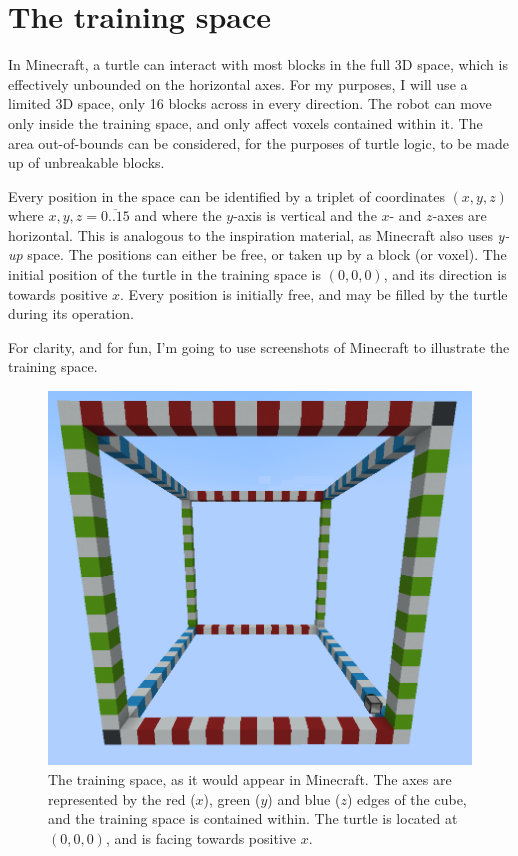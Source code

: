 \documentclass{report}
\begin{document}
\section{The training space}

In Minecraft, a turtle can interact with most blocks in the full 3D space, which is effectively unbounded on the horizontal axes. For my purposes, I will use a limited 3D space, only 16 blocks across in every direction. The robot can move only inside the training space, and only affect voxels contained within it. The area out-of-bounds can be considered, for the purposes of turtle logic, to be made up of unbreakable blocks.

Every position in the space can be identified by a triplet of coordinates $(x, y, z)$ where $x, y, z = \overline{0..15}$ and where the $y$-axis is vertical and the $x$- and $z$-axes are horizontal. This is analogous to the inspiration material, as Minecraft also uses \emph{y-up} space. The positions can either be free, or taken up by a block (or voxel). The initial position of the turtle in the training space is $(0, 0, 0)$, and its direction is towards positive $x$. Every position is initially free, and may be filled by the turtle during its operation.

For clarity, and for fun, I'm going to use screenshots of Minecraft to illustrate the training space.

\begin{figure}[H]
    \centering
    \includegraphics[scale=0.4]{minecraft1}
    \caption{The training space, as it would appear in Minecraft. The axes are represented by the red ($x$), green ($y$) and blue ($z$) edges of the cube, and the training space is contained within. The turtle is located at $(0, 0, 0)$, and is facing towards positive $x$.}
\end{figure}
\end{document}
